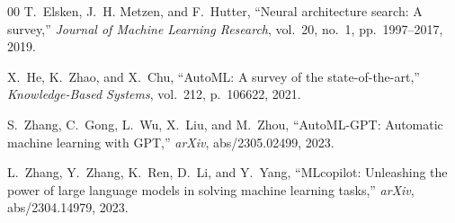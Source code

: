 \documentclass[conference]{IEEEtran}
\begin{document}
\begin{thebibliography}{00}
T.~Elsken, J.~H. Metzen, and F.~Hutter, ``Neural architecture search: A
survey,'' \textit{Journal of Machine Learning Research}, vol.~20, no.~1,
pp.~1997--2017, 2019.

X.~He, K.~Zhao, and X.~Chu, ``AutoML: A survey of the state-of-the-art,''
\textit{Knowledge-Based Systems}, vol.~212, p.~106622, 2021.

S.~Zhang, C.~Gong, L.~Wu, X.~Liu, and M.~Zhou, ``AutoML-GPT: Automatic machine
learning with GPT,'' \textit{arXiv}, abs/2305.02499, 2023.

L.~Zhang, Y.~Zhang, K.~Ren, D.~Li, and Y.~Yang, ``MLcopilot: Unleashing the
power of large language models in solving machine learning tasks,''
\textit{arXiv}, abs/2304.14979, 2023.

\end{thebibliography}
\end{document}
